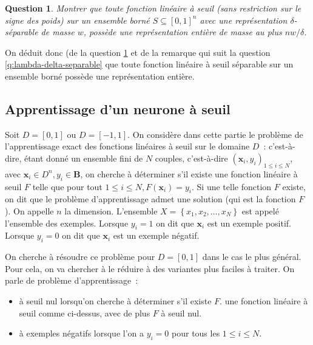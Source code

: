 \documentclass[10pt]{article}
\newtheorem{question}{Question}
\begin{document}
\begin{question}
	\label{q:seuil-representation}
	Montrer que toute fonction linéaire à seuil (sans restriction sur le signe des poids) sur un ensemble borné $S \subseteq[0,1]^{n}$ avec une représentation $δ$-séparable de masse $w$, possède une représentation entière de masse au plus $n w / δ$.
\end{question}

On déduit donc (de la question \ref{q:seuil-representation} et de la remarque qui suit la question \ref{q:lambda-delta-separable} que toute fonction linéaire à seuil séparable sur un ensemble borné possède une représentation entière.

\subsection{Apprentissage d'un neurone à seuil}

Soit $D=[0,1]$ ou $D=[-1,1]$. On considère dans cette partie le problème de l'apprentissage exact des fonctions linéaires à seuil sur le domaine $D$ : c'est-à-dire, étant donné un ensemble fini de $N$ couples, c'est-à-dire $\left(\mathbf{x}_{i}, y_{i}\right)_{1 ≤ i ≤ N}$, avec $\mathbf{x}_{i} \in D^{n}, y_{i} \in \mathbf{B}$, on cherche à déterminer s'il existe une fonction linéaire à seuil $F$ telle que pour tout $1 ≤ i ≤ N, F\left(\mathbf{x}_{i}\right)=y_{i}$. Si une telle fonction $F$ existe, on dit que le problème d'apprentissage admet une solution (qui est la fonction $F$ ). On appelle $n$ la dimension. L'ensemble $X=\left\{x_{1}, x_{2}, \ldots, x_{N}\right\}$ est appelé l'ensemble des exemples. Lorsque $y_{i}=1$ on dit que $\mathbf{x}_{i}$ est un exemple positif. Lorsque $y_{i}=0$ on dit que $\mathbf{x}_{i}$ est un exemple négatif.

On cherche à résoudre ce problème pour $D=[0,1]$ dans le cas le plus général. Pour cela, on va chercher à le réduire à des variantes plus faciles à traiter. On parle de problème d'apprentissage :

\begin{itemize}
  \item à seuil nul lorsqu'on cherche à déterminer s'il existe $F$. une fonction linéaire à seuil comme ci-dessus, avec de plus $F$ à seuil nul.

  \item à exemples négatifs lorsque l'on a $y_{i}=0$ pour tous les $1 ≤ i ≤ N$.

\end{itemize}
\end{document}
